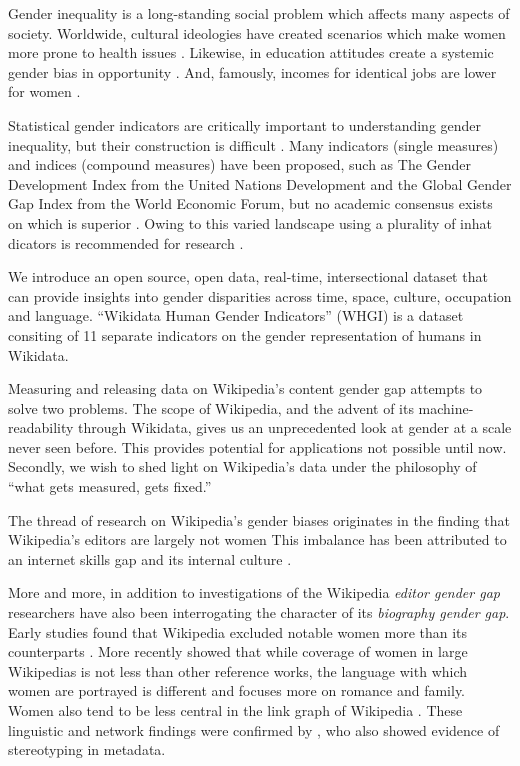 \documentclass{sig-alternate-05-2015}
\begin{document}
Gender inequality is a long-standing social problem which affects many aspects of society. Worldwide, cultural ideologies have created scenarios which make women more prone to health issues \cite{world_health_organization_women_2009}. Likewise, in education attitudes create a systemic gender bias in opportunity \cite{heward_gender_1999}. And, famously, incomes for identical jobs are lower for women \cite{burstein_equal_????}.

Statistical gender indicators are critically important to understanding gender inequality, but their construction is difficult \cite{klasen_gender-related_2004}. Many indicators (single measures) and indices (compound measures) have been proposed, such as The Gender Development Index from the United Nations Development and the Global Gender Gap Index from the World Economic Forum, but no academic consensus exists on which is superior \cite{hawken_cross-national_2012}. Owing to this varied landscape using a plurality of inhat dicators is recommended for research \cite{jutting_measuring_2008}.

We introduce an open source, open data, real-time, intersectional dataset that can provide insights into gender disparities across time, space, culture, occupation and language. ``Wikidata Human Gender Indicators'' (WHGI) is a dataset consiting  of 11 separate indicators on the gender representation of humans in Wikidata.

Measuring and releasing data on Wikipedia's content gender gap attempts to solve two problems. The scope of Wikipedia, and the advent of its machine-readability through Wikidata, gives us an unprecedented look at gender at a scale never seen before. This provides potential for applications not possible until now. Secondly, we wish to shed light on Wikipedia's data under the philosophy of ``what gets measured, gets fixed.''

The thread of research on Wikipedia's gender biases originates in the finding that Wikipedia's editors are largely not women \cite{glott2010wikipedia} This imbalance has been attributed to an internet skills gap \cite{hargittai_mind_2015} and its internal culture \cite{lam_wp:clubhouse?:_2011}.

More and more, in addition to investigations of the Wikipedia \textit{editor gender gap} researchers have also been interrogating the character of its \textit{biography gender gap}. Early studies found that Wikipedia excluded notable women more than its counterparts \cite{reagle_gender_2011}. More recently \cite{wagner_its_2015} showed that while coverage of women in large Wikipedias is not less than other reference works, the language with which women are portrayed is different and focuses more on romance and family. Women also tend to be less central in the link graph of Wikipedia \cite{10.1371/journal.pone.0114825}. These linguistic and network findings were confirmed by \cite{graells-garrido_first_2015}, who also showed evidence of stereotyping in metadata.
\end{document}
